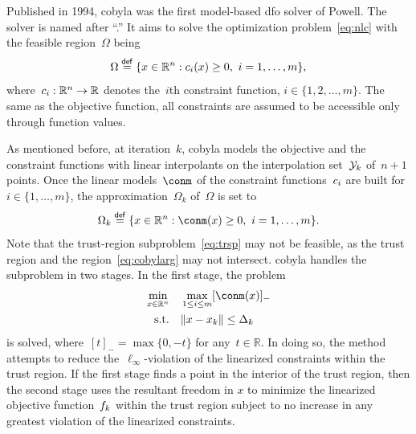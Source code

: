 \documentclass[
    smallextended,  %
    final,        %
]{svjour3}
\newcommand{\R}{\mathbb{R}}
\newcommand{\con}[1][i]{c\ifthenelse{\equal{#1}{}}{}{_{#1}}}
\newcommand{\eqdef}{\mathrel{\stackrel{\mathsf{def}}{=}}}
\newcommand{\fsetm}[1][k]{\Omega_{#1}}
\newcommand{\fset}{\Omega}
\newcommand{\iter}[1][k]{x\ifthenelse{\equal{#1}{}}{}{_{#1}}}
\newcommand{\norm}[2][]{#1\lVert#2#1\rVert}
\newcommand{\objm}[1][k]{\obj\ifthenelse{\equal{#1}{}}{}{_{#1}}}
\newcommand{\obj}{f}
\newcommand{\rad}[1][k]{\Delta\ifthenelse{\equal{#1}{}}{}{_{#1}}}
\newcommand{\set}[2][]{#1\{#2#1\}}
\newcommand{\st}{\text{s.t.}}
\newcommand{\xpt}[1][k]{\mathcal{Y}\ifthenelse{\equal{#1}{}}{}{_{#1}}}
\begin{document}
Published in 1994, \gls{cobyla} was the first model-based \gls{dfo} solver of Powell.
The solver is named after ``.''
It aims to solve the optimization problem~\eqref{eq:nlc} with the feasible region~$\fset$ being
\begin{equation*}
    \fset \eqdef \set{x \in \R^n : \con(x) \ge 0, ~ i = 1, \dots, m},
\end{equation*}
where~$\con : \R^n \to \R$ denotes the~$i$th constraint function, $i \in \set{1, 2, \dots, m}$.
The same as the objective function, all constraints are assumed to be accessible only through function values.

As mentioned before, at iteration~$k$, \gls{cobyla} models the objective and the constraint functions with {linear}
interpolants on the interpolation set~$\xpt$ of~$n + 1$ points.
Once the linear models~$\conm$ of the constraint functions~$\con$ are built for~$i \in \set{1, \dots, m}$, the approximation~$\fsetm$ of~$\fset$ is set to
\begin{equation}
    \label{eq:cobylarg}
    \fsetm \eqdef \set{x \in \R^n : \conm(x) \ge 0, ~ i=1, \dots, m}.
\end{equation}
Note that the trust-region subproblem~\eqref{eq:trsp} may not be feasible,
as the trust region and the region~\eqref{eq:cobylarg} may not intersect.
\gls{cobyla} handles the subproblem in two stages. In the first stage, the problem
\begin{equation}
    \label{eq:cobyla_sp1}
    \begin{split}
    \min_{x \in \R^n}   & \quad \max_{1 \le i \le m} [\conm(x)]_{-}\\
    \st                 & \quad \norm{x - \iter} \le \rad
    \end{split}
\end{equation}
is solved, where~$[t]_{-} = \max \set{0, -t}$ for any~$t\in \R$.
In doing so, the method attempts to reduce the~$\ell_{\infty}$-violation of the linearized constraints within the trust region.
If the first stage finds a point in the interior of the trust region,
then the second stage uses the resultant freedom in $x$ to minimize the linearized objective
function~$\objm$ within the trust region subject to no increase in any greatest violation of the
linearized constraints.


\subsection{}
\label{ssec:uobyqa}
\end{document}
